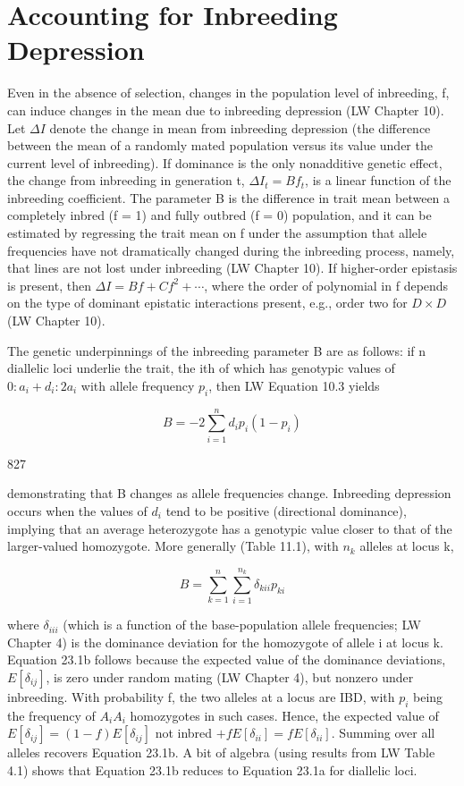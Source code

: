 \documentclass{article}
\begin{document}
\section{Accounting for Inbreeding Depression}
Even in the absence of selection, changes in the population level of inbreeding, f, can induce changes in the mean due to inbreeding depression (LW Chapter 10). Let  $ \Delta I $ denote the change in mean from inbreeding depression (the difference between the mean of a randomly mated population versus its value under the current level of inbreeding). If dominance is the only nonadditive genetic effect, the change from inbreeding in generation t,  $ \Delta I_t = Bf_t $, is a linear function of the inbreeding coefficient. The parameter B is the difference in trait mean between a completely inbred (f = 1) and fully outbred (f = 0) population, and it can be estimated by regressing the trait mean on f under the assumption that allele frequencies have not dramatically changed during the inbreeding process, namely, that lines are not lost under inbreeding (LW Chapter 10). If higher-order epistasis is present, then  $ \Delta I = Bf + Cf^2 + \cdots $, where the order of polynomial in f depends on the type of dominant epistatic interactions present, e.g., order two for  $ D \times D $ (LW Chapter 10).

The genetic underpinnings of the inbreeding parameter B are as follows: if n diallelic loci underlie the trait, the ith of which has genotypic values of  $ 0 : a_i + d_i : 2a_i $ with allele frequency  $ p_i $, then LW Equation 10.3 yields

\begin{equation}
B=-2\sum_{i=1}^{n}d_{i}p_{i}(1-p_{i})
\tag{23.1a}
\label{eq:23_1a}
\end{equation}

827

demonstrating that B changes as allele frequencies change. Inbreeding depression occurs when the values of  $ d_{i} $ tend to be positive (directional dominance), implying that an average heterozygote has a genotypic value closer to that of the larger-valued homozygote. More generally (Table 11.1), with  $ n_{k} $ alleles at locus k,

\begin{equation}
B=\sum_{k=1}^{n}\sum_{i=1}^{n_{k}}\delta_{kii}p_{ki}
\tag{23.1b}
\label{eq:23_1b}
\end{equation}

where  $ \delta_{iii} $ (which is a function of the base-population allele frequencies; LW Chapter 4) is the dominance deviation for the homozygote of allele i at locus k. Equation 23.1b follows because the expected value of the dominance deviations,  $ E[\delta_{ij}] $, is zero under random mating (LW Chapter 4), but nonzero under inbreeding. With probability f, the two alleles at a locus are IBD, with  $ p_i $ being the frequency of  $ A_i A_i $ homozygotes in such cases. Hence, the expected value of  $ E[\delta_{ij}] = (1 - f)E[\delta_{ij}] $ not inbred  $ + fE[\delta_{ii}] = fE[\delta_{ii}] $. Summing over all alleles recovers Equation 23.1b. A bit of algebra (using results from LW Table 4.1) shows that Equation 23.1b reduces to Equation 23.1a for diallelic loci.
\end{document}

